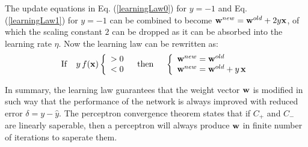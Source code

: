 \documentclass{article}
\begin{document}
The update equations in Eq. (\ref{learningLaw0}) for $y=-1$ and 
Eq. (\ref{learningLaw1}) for $y=-1$ can be combined to become
${\bf w}^{new}={\bf w}^{old}+2 y {\bf x}$, of which the scaling 
constant $2$ can be dropped as it can be absorbed into the learning 
rate $\eta$. Now  the learning law can be rewritten as:
\begin{equation}
  \mbox{If}\;\;\;\;y\,f({\bf x})\left\{\begin{array}{c}
  >0\\<0 \end{array}\right.
  \;\;\;\mbox{then}\;\;\;\;\;
  \left\{\begin{array}{l}  {\bf w}^{new}={\bf w}^{old} \\
  {\bf w}^{new}={\bf w}^{old}+y\,{\bf x}
  \end{array}\right.
\end{equation}

In summary, the learning law guarantees that the weight vector ${\bf w}$ 
is modified in such way that the performance of the network is always 
improved with reduced error $\delta=y-\hat{y}$. The perceptron convergence 
theorem states that if $C_+$ and $C_-$ are linearly saperable, then a 
perceptron will always produce ${\bf w}$ in finite number of iterations 
to saperate them.
\end{document}
